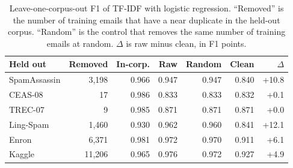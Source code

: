 \begin{table}[t]
\caption{Leave-one-corpus-out F1 of TF-IDF with logistic regression. ``Removed'' is the number of training emails that have a near duplicate in the held-out corpus. ``Random'' is the control that removes the same number of training emails at random. $\Delta$ is raw minus clean, in F1 points.}
\label{tab:inflation}
\centering\footnotesize
\setlength{\tabcolsep}{2pt}
\begin{tabular}{lrrrrrr}
\toprule
Held out & Removed & In-corp. & Raw & Random & Clean & $\Delta$ \\
\midrule
SpamAssassin & 3,198 & 0.966 & 0.947 & 0.947 & 0.840 & +10.8 \\
CEAS-08 & 17 & 0.986 & 0.833 & 0.833 & 0.832 & +0.1 \\
TREC-07 & 9 & 0.985 & 0.871 & 0.871 & 0.871 & +0.0 \\
Ling-Spam & 1,460 & 0.930 & 0.962 & 0.960 & 0.841 & +12.1 \\
Enron & 6,371 & 0.981 & 0.972 & 0.970 & 0.911 & +6.1 \\
Kaggle & 11,206 & 0.965 & 0.976 & 0.972 & 0.927 & +4.9 \\
\bottomrule
\end{tabular}
\end{table}
